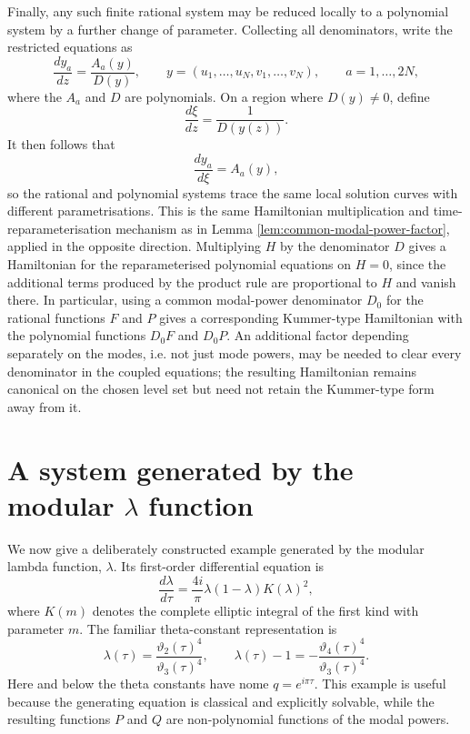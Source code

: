 \documentclass[11pt,a4paper]{article}
\numberwithin{equation}{section}
\begin{document}
Finally, any such finite rational system may be reduced locally to a polynomial system by a further change of parameter.
Collecting all denominators, write the restricted equations as
\begin{equation}
    \frac{dy_a}{dz}=\frac{A_a(y)}{D(y)},
    \qquad
    y=(u_1,\dots,u_N,v_1,\dots,v_N),
    \qquad a=1,\dots,2N,
    \label{eq:rational-system-common-denominator}
\end{equation}
where the $A_a$ and $D$ are polynomials.
On a region where $D(y)\ne0$, define
\begin{equation}
    \frac{d\xi}{dz}=\frac{1}{D(y(z))}.
\end{equation}
It then follows that
\begin{equation}
    \frac{dy_a}{d\xi}=A_a(y),
\end{equation}
so the rational and polynomial systems trace the same local solution curves with different parametrisations.
This is the same Hamiltonian multiplication and time-reparameterisation mechanism as in Lemma \ref{lem:common-modal-power-factor}, applied in the opposite direction.
Multiplying $H$ by the denominator $D$ gives a Hamiltonian for the reparameterised polynomial equations on $H=0$, since the additional terms produced by the product rule are proportional to $H$ and vanish there.
In particular, using a common modal-power denominator $D_0$ for the rational functions $F$ and $P$ gives a corresponding Kummer-type Hamiltonian with the polynomial functions $D_0F$ and $D_0P$.
An additional factor depending separately on the modes, i.e. not just mode powers, may be needed to clear every denominator in the coupled equations; the resulting Hamiltonian remains canonical on the chosen level set but need not retain the Kummer-type form away from it.


\section{A system generated by the modular \texorpdfstring{$\lambda$}{lambda} function}
\label{sec:modular-example}

We now give a deliberately constructed example generated by the modular lambda function, $\lambda$.
Its first-order differential equation is
\begin{equation}
    \frac{d\lambda}{d\tau}
    =\frac{4i}{\pi}\lambda(1-\lambda)K(\lambda)^2,
    \label{eq:modular-lambda-ode}
\end{equation}
where $K(m)$ denotes the complete elliptic integral of the first kind with parameter $m$.
The familiar theta-constant representation is
\begin{equation}
    \lambda(\tau)
    =\frac{\vartheta_2(\tau)^4}{\vartheta_3(\tau)^4},
    \qquad
    \lambda(\tau)-1
    =-\frac{\vartheta_4(\tau)^4}{\vartheta_3(\tau)^4}.
    \label{eq:modular-lambda-theta}
\end{equation}
Here and below the theta constants have nome $q=e^{i\pi\tau}$.
This example is useful because the generating equation is classical and explicitly solvable, while the resulting functions $P$ and $Q$ are non-polynomial functions of the modal powers.
\end{document}
